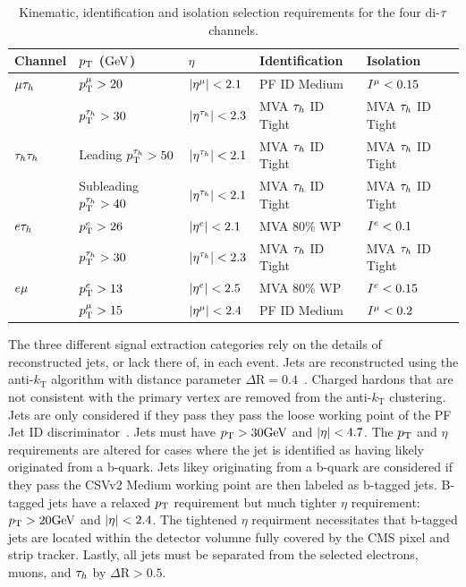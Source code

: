 \begin{table}[htbp]
\centering
\begin{small}
\begin{tabular}{l|l|l|l|l}
  Channel       & $p_\mathrm{T}$ ($\mathrm{GeV}$) & $\eta$ & Identification & Isolation \\
\hline
  $\mu\tau_{h}$       &   $p_\mathrm{T}^{\mu}>20$     &  $\lvert\eta^{\mu}\rvert<2.1$    &   PF ID Medium &  $I^{\mu}<0.15$       \\
                   &   $p_\mathrm{T}^{\tau_{h}}>30$  &  $\lvert\eta^{\tau_{h}}\rvert<2.3$ &   MVA $\tau_{h}$ ID Tight & MVA $\tau_{h}$ ID Tight \\
\hline
 $\tau_{h}\tau_{h}$      &   Leading $p_\mathrm{T}^{\tau_{h}}>50$ & $\lvert\eta^{\tau_{h}}\rvert<2.1$  &    MVA $\tau_{h}$ ID Tight    & MVA $\tau_{h}$ ID Tight    \\
                   &   Subleading $p_\mathrm{T}^{\tau_{h}}>40$ & $\lvert\eta^{\tau_{h}}\rvert<2.1$  &    MVA $\tau_{h}$ ID Tight & MVA $\tau_{h}$ ID Tight    \\
\hline
  $e\tau_{h}$       &   $p_\mathrm{T}^{e}>26$      & $\lvert\eta^{e}\rvert<2.1$       &   MVA 80\% WP  &  $I^{e}<0.1$  \\
                   &   $p_\mathrm{T}^{\tau_{h}}>30$  &  $\lvert\eta^{\tau_{h}}\rvert<2.3$  &   MVA $\tau_{h}$ ID Tight & MVA $\tau_{h}$ ID Tight \\
\hline
  $e\mu$        &   $p_\mathrm{T}^{e}>13$    & $\lvert\eta^{e}\rvert<2.5$   &   MVA 80\% WP   & $I^{e}<0.15$   \\
                   &   $p_\mathrm{T}^{\mu}>15$   & $\lvert\eta^{\mu}\rvert<2.4$  & PF ID Medium &  $I^{\mu}<0.2$    \\
\hline
\end{tabular}
\end{small}
\caption{Kinematic, identification and isolation selection requirements for the four di-$\tau$ channels.
\label{tab:htt_obj_selection}
}
\end{table}


The three different signal extraction categories rely on the details of reconstructed jets, or
lack there of, in each event.  Jets are reconstructed using the anti-$k_{\text{T}}$ algorithm with distance
parameter $\Delta\text{R}=0.4$~\cite{Cacciari:2008gp}.  Charged hardons that are not consistent with
the primary vertex are removed from the anti-$k_{\text{T}}$ clustering.  Jets are only considered
if they pass they pass the loose working point of the PF Jet ID discriminator~\cite{jetID}.
Jets must have $p_\mathrm{T} > 30 \mathrm{GeV}$ and $\lvert\eta\rvert<4.7$.  The $p_\mathrm{T}$ and $\eta$ requirements are altered
for cases where the jet is identified as having likely originated from a b-quark.  Jets likey originating
from a b-quark are considered if they pass the CSVv2 Medium working point are then labeled as b-tagged jets.
B-tagged jets have a relaxed $p_\mathrm{T}$ requirement but much tighter $\eta$ requirement: $p_\mathrm{T} > 20 \mathrm{GeV}$ 
and $\lvert\eta\rvert<2.4$.  The tightened $\eta$ requirment necessitates that b-tagged jets are located within
the detector volumne fully covered by the CMS pixel and strip tracker.
Lastly, all jets must be separated from the selected electrons, muons, and $\tau_{h}$ by $\Delta\text{R}>0.5$.

